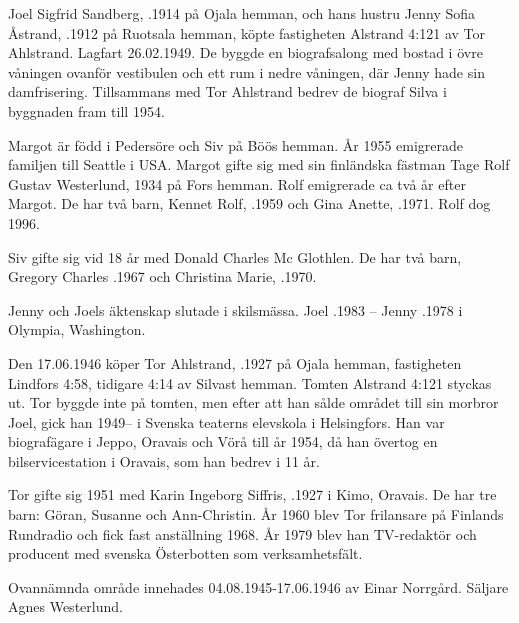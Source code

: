 Joel Sigfrid Sandberg, .1914 på Ojala hemman, och hans hustru Jenny Sofia Åstrand, .1912 på	Ruotsala hemman, köpte fastigheten Alstrand 4:121 av Tor Ahlstrand. Lagfart 26.02.1949. De byggde en biografsalong med bostad i övre våningen ovanför vestibulen och ett rum	i nedre våningen, där Jenny hade sin damfrisering. Tillsammans med Tor Ahlstrand bedrev de biograf Silva i byggnaden fram till 1954.
\begin{jhchildren}
  \item {}
  \item {}
\end{jhchildren}
Margot är född i Pedersöre och Siv på Böös hemman. År 1955 emigrerade familjen till Seattle i USA. Margot gifte sig	med sin finländska fästman Tage Rolf Gustav Westerlund,  1934 på Fors hemman. Rolf emigrerade ca två år  		efter Margot. De har två barn, Kennet Rolf, .1959 och Gina Anette, .1971. Rolf dog 1996.

Siv gifte sig vid 18 år med Donald Charles Mc Glothlen. De har två barn, Gregory Charles .1967 och 		Christina Marie, .1970.

Jenny och Joels äktenskap slutade i skilsmässa.	Joel .1983  --  Jenny .1978 i Olympia,		Washington.


Den 17.06.1946 köper Tor Ahlstrand, .1927 på Ojala hemman, fastigheten Lindfors 4:58, tidigare 4:14 av 		Silvast hemman. Tomten Alstrand 4:121 styckas ut.	Tor byggde inte på tomten, men efter att han sålde området till sin morbror Joel, gick han 1949-- i Svenska teaterns elevskola i Helsingfors. Han var biografägare i Jeppo, Oravais och Vörå till år 1954, då han övertog en bilservicestation i Oravais, som han bedrev i 11 år.

Tor gifte sig 1951 med Karin Ingeborg Siffris, .1927 i Kimo, Oravais. De har tre barn: Göran, Susanne och Ann-Christin.	År 1960 blev Tor frilansare på Finlands Rundradio och fick fast anställning 1968. År 1979 blev han TV-redaktör och producent med svenska Österbotten som verksamhetsfält.


Ovannämnda område innehades 04.08.1945-17.06.1946	av Einar Norrgård. Säljare Agnes Westerlund.\jhvspace{}


